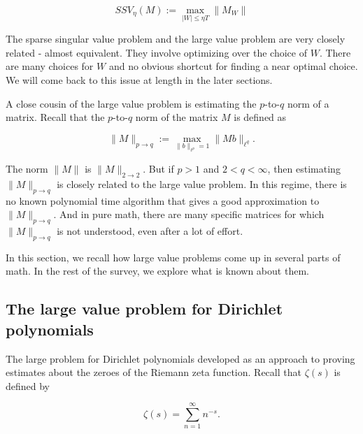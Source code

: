 \documentclass{amsart}
\begin{document}
\begin{equation}
SSV_{\eta}(M) := \max_{|W| \le \eta T} \| M_W \|
\end{equation}

\noindent The sparse singular value problem and the large value problem are very closely related - almost equivalent.  They involve optimizing over the choice of $W$.   There are many choices for $W$ and no obvious shortcut for finding a near optimal choice.   We will come back to this issue at length in the later sections.

A close cousin of the large value problem is estimating the $p$-to-$q$ norm of a matrix.  Recall that the $p$-to-$q$ norm of the matrix $M$ is defined as

$$ \| M \|_{p \rightarrow q} := \max_{\| b \|_{\ell^p} =1} \| Mb \|_{\ell^q}. $$

The norm $\| M \|$ is $\| M \|_{2 \rightarrow 2}$.  But if $p > 1$ and $2 < q < \infty$,  then estimating $\| M \|_{p \rightarrow q}$ is closely related to the large value problem.  In this regime, 
there is no known polynomial time algorithm that gives a good approximation to $\| M \|_{p \rightarrow q}$.  And in pure math, there are many specific matrices for which $\| M \|_{p \rightarrow q}$ is not understood, even after a lot of effort.

In this section, we recall how large value problems come up in several parts of math.  In the rest of the survey, we explore what is known about them.  















\subsection{The large value problem for Dirichlet polynomials}

The large problem for Dirichlet polynomials developed as an approach to proving estimates about the zeroes of the Riemann zeta function.   Recall that $\zeta(s)$ is defined by 

\begin{equation} \label{zeta} \zeta(s) = \sum_{n=1}^\infty n^{-s}.\end{equation}
\end{document}
